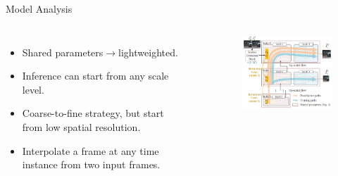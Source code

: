 \documentclass[aspectratio=43]{beamer}
\begin{document}
	\begin{frame}{Model Analysis}
		\begin{columns}[c]
			\begin{itemize}
				\item {Shared parameters$\to$\alert{lightweighted}.}
				\item {Inference can start from any scale level.}
				\item {Coarse-to-fine strategy, but start from \alert{low spatial resolution}.}
				\item {Interpolate a frame at \alert{any time} instance from two input frames.}
			\end{itemize}\
			\begin{figure}
				\centering
				\includegraphics[width=6cm]{images/all_structure.png}
			\end{figure}
		\end{columns}
	\end{frame}
\end{document}
